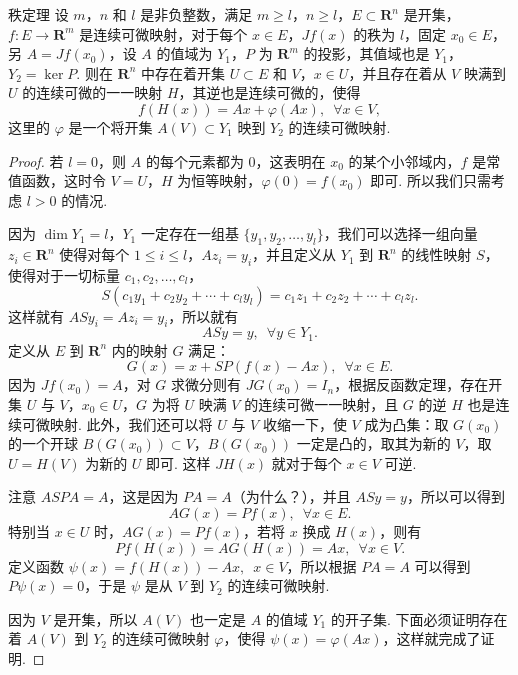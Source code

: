 \begin{theorem}{秩定理}{}
    设 $m$，$n$ 和 $l$ 是非负整数，满足 $m \geqslant l$，$n\geqslant l$，$E \subset \mathbf{R}^n$ 是开集，$f \colon E \to \mathbf{R}^m$ 是连续可微映射，对于每个 $x\in E$，$Jf(x)$ 的秩为 $l$，固定 $x_0\in E$，另 $A = Jf(x_0)$，设 $A$ 的值域为 $Y_1$，$P$ 为 $\mathbf{R}^m$ 的投影，其值域也是 $Y_1$，$Y_2 = \ker P$. 则在 $\mathbf{R}^n$ 中存在着开集 $U\subset E$ 和 $V$，$x \in U$，并且存在着从 $V$ 映满到 $U$ 的连续可微的一一映射 $H$，其逆也是连续可微的，使得 \[f(H(x)) = Ax + \varphi(Ax), \enspace \forall x\in V,\]
    这里的 $\varphi$ 是一个将开集 $A(V)\subset Y_1$ 映到 $Y_2$ 的连续可微映射.
\end{theorem}

\begin{proof}
    若 $l = 0$，则 $A$ 的每个元素都为 $0$，这表明在 $x_0$ 的某个小邻域内，$f$ 是常值函数，这时令 $V = U$，$H$ 为恒等映射，$\varphi(0) = f(x_0)$ 即可. 所以我们只需考虑 $l > 0$ 的情况.

    因为 $\dim Y_1 = l$，$Y_1$ 一定存在一组基 $\{y_1, y_2, \ldots, y_l\}$，我们可以选择一组向量 $z_i\in \mathbf{R}^n$ 使得对每个 $1 \leqslant i \leqslant l$，$Az_i = y_i$，并且定义从 $Y_1$ 到 $\mathbf{R}^n$ 的线性映射 $S$，使得对于一切标量 $c_1, c_2, \ldots, c_l$，\[S(c_1y_1 + c_2y_2 + \cdots + c_ly_l) = c_1z_1 + c_2z_2 + \cdots + c_lz_l.\]
    这样就有 $ASy_i = Az_i = y_i$，所以就有 \[ASy = y, \enspace \forall y\in Y_1.\]
    定义从 $E$ 到 $\mathbf{R}^n$ 内的映射 $G$ 满足：\[G(x) = x + SP(f(x) - Ax), \enspace \forall x\in E.\]
    因为 $Jf(x_0) = A$，对 $G$ 求微分则有 $JG(x_0) = I_n$，根据反函数定理，存在开集 $U$ 与 $V$，$x_0\in U$，$G$ 为将 $U$ 映满 $V$ 的连续可微一一映射，且 $G$ 的逆 $H$ 也是连续可微映射. 此外，我们还可以将 $U$ 与 $V$ 收缩一下，使 $V$ 成为凸集：取 $G(x_0)$ 的一个开球 $B(G(x_0)) \subset V$，$B(G(x_0))$ 一定是凸的，取其为新的 $V$，取 $U = H(V)$ 为新的 $U$ 即可. 这样 $JH(x)$ 就对于每个 $x\in V$ 可逆.

    注意 $ASPA = A$，这是因为 $PA = A$（为什么？），并且 $ASy = y$，所以可以得到 \[AG(x) = Pf(x), \enspace \forall x\in E.\]
    特别当 $x\in U$ 时，$AG(x) = Pf(x)$，若将 $x$ 换成 $H(x)$，则有 \[Pf(H(x)) = AG(H(x)) = Ax, \enspace \forall x\in V.\]
    定义函数 $\psi(x) = f(H(x)) - Ax, \enspace x\in V$，所以根据 $PA = A$ 可以得到 $P\psi(x) = 0$，于是 $\psi$ 是从 $V$ 到 $Y_2$ 的连续可微映射.

    因为 $V$ 是开集，所以 $A(V)$ 也一定是 $A$ 的值域 $Y_1$ 的开子集. 下面必须证明存在着 $A(V)$ 到 $Y_2$ 的连续可微映射 $\varphi$，使得 $\psi(x) = \varphi(Ax)$，这样就完成了证明.


\end{proof}
